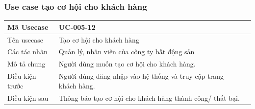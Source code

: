 \documentclass[12pt,a4paper]{article}
\begin{document}
    \subsubsection*{Use case tạo cơ hội cho khách hàng}
    \begin{table}[H]
        \centering
        \begin{tabular}{|p{3.5cm}|p{11.5cm}|c|}
            \hline
            Mã Usecase      & UC-005-12                                                       \\
            \hline
            Tên usecase     & Tạo cơ hội cho khách hàng                                       \\
            \hline
            Các tác nhân    & Quản lý, nhân viên của công ty bất động sản                     \\
            \hline
            Mô tả chung     & Người dùng muốn tạo cơ hội cho khách hàng.                      \\
            \hline

            Điều kiện trước & Người dùng đăng nhập vào hệ thống và truy cập trang khách hàng. \\
            \hline

            Điều kiện sau   & Thông báo tạo cơ hội cho khách hàng thành công/ thất bại.       \\
            \hline


\end{tabular}
\end{table}
\end{document}
